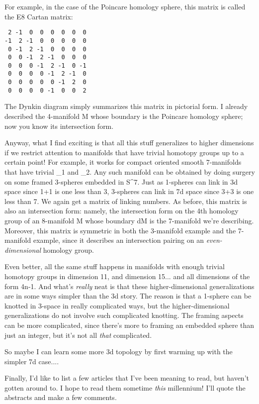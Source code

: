 For example, in the case of the Poincare homology sphere, this matrix 
is called the E8 Cartan matrix:

\begin{verbatim}
 2 -1  0  0  0  0  0  0
-1  2 -1  0  0  0  0  0 
 0 -1  2 -1  0  0  0  0 
 0  0 -1  2 -1  0  0  0 
 0  0  0 -1  2 -1  0 -1
 0  0  0  0 -1  2 -1  0
 0  0  0  0  0 -1  2  0 
 0  0  0  0 -1  0  0  2
\end{verbatim}
    
The Dynkin diagram simply summarizes this matrix in pictorial form.  
I already described the 4-manifold M whose boundary is the Poincare
homology sphere; now you know its intersection form. 

Anyway, what I find exciting is that all this stuff generalizes to
higher dimensions if we restrict attention to manifolds that have
trivial homotopy groups up to a certain point!  For example, it works
for compact oriented smooth 7-manifolds that have trivial \pi _{1}
and \pi _{2}.  Any such manifold can be obtained by doing surgery
on some framed 3-spheres embedded in S^{7}.  Just as 1-spheres
can link in 3d space since 1+1 is one less than 3, 3-spheres can link in
7d space since 3+3 is one less than 7.  We again get a matrix of linking
numbers.  As before, this matrix is also an intersection form: namely,
the intersection form on the 4th homology group of an 8-manifold M whose
boundary dM is the 7-manifold we're describing.  Moreover, this matrix
is symmetric in both the 3-manifold example and the 7-manifold example,
since it describes an intersection pairing on an
\emph{even-dimensional} homology group.

Even better, all the same stuff happens in manifolds with enough
trivial homotopy groups in dimension 11, and dimension 15... and 
all dimensions of the form 4n-1.  And what's \emph{really} neat is that 
these higher-dimensional generalizations are in some ways simpler 
than the 3d story.  The reason is that a 1-sphere can be knotted 
in 3-space in really complicated ways, but the higher-dimensional 
generalizations do not involve such complicated knotting.  The 
framing aspects can be more complicated, since there's more to 
framing an embedded sphere than just an integer, but it's not all
\emph{that} complicated. 

So maybe I can learn some more 3d topology by first warming up with
the simpler 7d case....

Finally, I'd like to list a few articles that I've been meaning to
read, but haven't gotten around to.  I hope to read them sometime
\emph{this} millennium!  I'll quote the abstracts and make a few comments.

